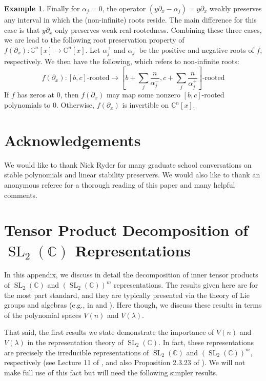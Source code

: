 \documentclass{article}
\theoremstyle{definition}
\newtheorem{example}[theorem]{Example}
\theoremstyle{plain}
\newcommand{\C}{\mathbb{C}}
\DeclareMathOperator{\SL}{SL}
\begin{document}
\begin{example}
    Finally for $\alpha_j = 0$, the operator $(y\partial_x - \alpha_j) = y\partial_x$ weakly preserves any interval in which the (non-infinite) roots reside. The main difference for this case is that $y\partial_x$ only preserves weak real-rootedness. Combining these three cases, we are lead to the following root preservation property of $f(\partial_x): \C^n[x] \to \C^n[x]$. Let $\alpha_j^+$ and $\alpha_j^-$ be the positive and negative roots of $f$, respectively. We then have the following, which refers to non-infinite roots:
    \[
        f(\partial_x): [b,c]\text{-rooted} \to \left[b + \sum_j \frac{n}{\alpha_j^-}, c + \sum_j \frac{n}{\alpha_j^+}\right]\text{-rooted}
    \]
    If $f$ has zeros at 0, then $f(\partial_x)$ may map some nonzero $[b,c]$-rooted polynomials to 0. Otherwise, $f(\partial_x)$ is invertible on $\C^n[x]$.
\end{example}


\section*{Acknowledgements}

We would like to thank Nick Ryder for many graduate school conversations on stable polynomials and linear stability preservers. We would also like to thank an anonymous referee for a thorough reading of this paper and many helpful comments.





\clearpage
\appendix


\section{Tensor Product Decomposition of \texorpdfstring{$\SL_2(\C)$}{SL2(C)} Representations}\label{sl2_app}

In this appendix, we discuss in detail the decomposition of inner tensor products of $\SL_2(\C)$ and $(\SL_2(\C))^m$ representations. The results given here are for the most part standard, and they are typically presented via the theory of Lie groups and algebras (e.g., in \cite{fulton2013reptheory} and \cite{humphreys2012lietheory}). Here though, we discuss these results in terms of the polynomial spaces $V(n)$ and $V(\lambda)$.

That said, the first results we state demonstrate the importance of $V(n)$ and $V(\lambda)$ in the representation theory of $\SL_2(\C)$. In fact, these representations are precisely the irreducible representations of $\SL_2(\C)$ and $(\SL_2(\C))^m$, respectively (see Lecture 11 of \cite{fulton2013reptheory}, and also Proposition 2.3.23 of \cite{kowalski2014introduction}). We will not make full use of this fact but will need the following simpler results.
\end{document}
